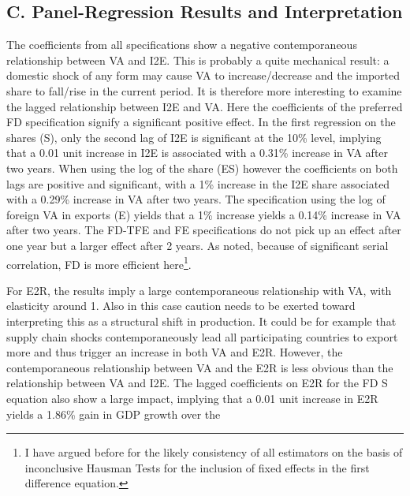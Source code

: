 \documentclass[a4paper]{article}
\begin{document}
\newpage

\subsection*{C. Panel-Regression Results and Interpretation}
\setcounter{table}{0}
\renewcommand{\thetable}{C\arabic{table}}
\setcounter{figure}{0}
\renewcommand{\thefigure}{C\arabic{figure}}


The coefficients from all specifications show a negative contemporaneous relationship between VA and I2E. This is probably a quite mechanical result: a domestic shock of any form may cause VA to increase/decrease and the imported share to fall/rise in the current period. It is therefore more interesting to examine the lagged relationship between I2E and VA. Here the coefficients of the preferred FD specification signify a significant positive effect. In the first regression on the shares (S), only the second lag of I2E is significant at the 10\% level, implying that a 0.01 unit increase in I2E is associated with a 0.31\% increase in VA after two years. When using the log of the share (ES) however the coefficients on both lags are positive and significant, with a 1\% increase in the I2E share associated with a  0.29\% increase in VA after two years. The specification using the log of foreign VA in exports (E) yields that a 1\% increase yields a 0.14\% increase in VA after two years. The FD-TFE and FE specifications do not pick up an effect after one year but a larger effect after 2 years. As noted, because of significant serial correlation, FD is more efficient here\footnote{I have argued before for the likely consistency of all estimators on the basis of inconclusive Hausman Tests for the inclusion of fixed effects in the first difference equation.}. \newline %

For E2R, the results imply a large contemporaneous relationship with VA, with elasticity around 1. Also in this case caution needs to be exerted toward interpreting this as a structural shift in production. It could be for example that supply chain shocks contemporaneously lead all participating countries to export more and thus trigger an increase in both VA and E2R. However, the contemporaneous relationship between VA and the E2R is less obvious than the relationship between VA and I2E. The lagged coefficients on E2R for the FD S equation also show a large impact, implying that a 0.01 unit increase in E2R yields a 1.86\% gain in GDP growth over the 
\end{document}
